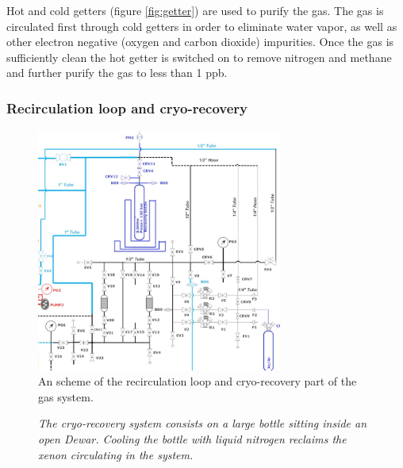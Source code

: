 Hot and cold getters (figure \ref{fig:getter}) are used to purify the gas. The gas is circulated first through cold getters in order to eliminate water vapor, as well as other electron negative (oxygen and carbon dioxide) impurities. Once the gas is sufficiently clean the hot getter is switched on to remove nitrogen and methane and further purify the gas to less than 1 ppb. 

\subsubsection*{Recirculation loop and cryo-recovery }

\begin{figure}[hpt!]
\centering
\includegraphics[height=8cm]{img2/Recirculation.png}
\caption{An scheme of the recirculation loop and cryo-recovery part of the gas system.} \label{fig.ct}
\end{figure}

\begin{figure}[hpt!]
    \bigskip
    \begin{center}\leavevmode
        \caption{\textit{The cryo-recovery system consists on a large bottle sitting inside an open Dewar. Cooling the bottle with liquid nitrogen reclaims the xenon circulating in the system.  }}
        \label{fig.CB}
    \end{center}
\end{figure}

